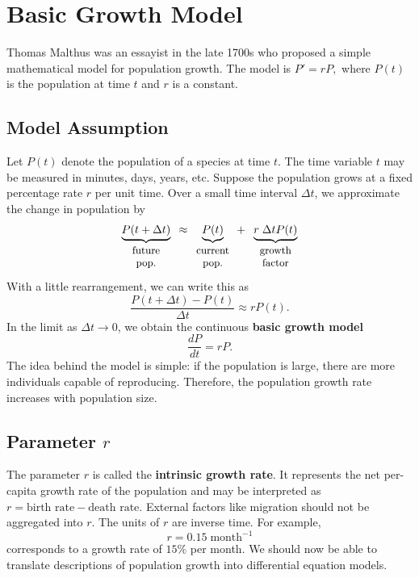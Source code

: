 \documentclass[10pt,letterpaper]{article}
\begin{document}

\section{Basic Growth Model}

Thomas Malthus was an essayist in the late 1700s who proposed a simple
mathematical model for population growth. The model is
$P'=rP,$
where $P(t)$ is the population at time $t$ and $r$ is a constant.



\subsection{Model Assumption}

Let $P(t)$ denote the population of a species at time $t$. The time variable
$t$ may be measured in minutes, days, years, etc. Suppose the population grows at a fixed percentage rate $r$ per unit time.
Over a small time interval $\Delta t$, we approximate the change in
population by
\[
\underbrace{P(t+\Delta t) }_{\small\begin{array}{c}
    \text{future}\\
    \text{pop.}
  \end{array}} 
\;\,\approx 
\underbrace{P(t)}_{\small\begin{array}{c}
    \text{current}\\
    \text{pop.}
  \end{array}}
  +\;\;
\underbrace{r\; \Delta t P(t)}_{ \small \begin{array}{c}
    \text{growth}\\
    \text{factor}
  \end{array}}
\]
With a little rearrangement, we can write this as
\[
\frac{P(t+\Delta t)-P(t)}{\Delta t}
\approx rP(t).
\]
In the limit as $\Delta t\to0$, we obtain the continuous \textbf{basic growth model}
\[
\frac{dP}{dt}=rP.
\]
The idea behind the model is simple: if the population is large, there are
more individuals capable of reproducing. Therefore, the population growth
rate increases with population size.

\subsection{Parameter $r$}
The parameter $r$ is called the \textbf{intrinsic growth rate}. It represents
the net per-capita growth rate of the population and may be interpreted as $r = \text{birth rate} - \text{death rate}$. External factors like migration should not be aggregated into $r$. The units of $r$ are inverse time. For example,
\[
r=0.15\;\text{month}^{-1}
\]
corresponds to a growth rate of $15\%$ per month.
We should now be able to translate descriptions of population growth into
differential equation models.
\end{document}
